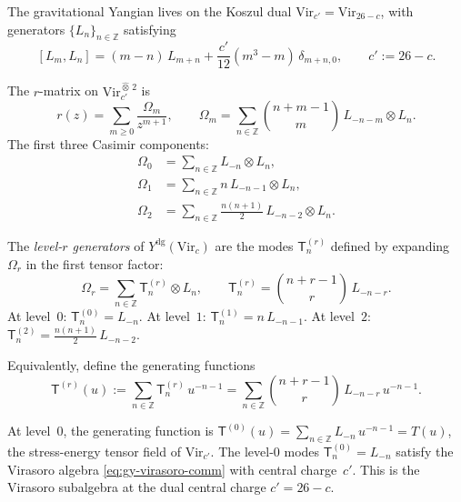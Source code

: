 \documentclass[11pt]{article}
\newcommand{\Z}{\mathbb{Z}}
\begin{document}
The gravitational Yangian lives on the Koszul dual
$\mathrm{Vir}_{c'} = \mathrm{Vir}_{26-c}$, with generators
$\{L_n\}_{n \in \Z}$ satisfying
\begin{equation}\label{eq:gy-virasoro-comm}
[L_m, L_n] = (m-n)\,L_{m+n}
+ \frac{c'}{12}(m^3 - m)\,\delta_{m+n,0},
\qquad c' := 26-c.
\end{equation}

The $r$-matrix on $\mathrm{Vir}_{c'}^{\widehat{\otimes}\,2}$ is
\begin{equation}\label{eq:gy-r-matrix}
r(z) = \sum_{m \ge 0} \frac{\Omega_m}{z^{m+1}},
\qquad
\Omega_m = \sum_{n \in \Z}
\binom{n+m-1}{m}\,L_{-n-m} \otimes L_n.
\end{equation}
The first three Casimir components:
\begin{align}
\Omega_0 &= \sum_{n \in \Z} L_{-n} \otimes L_n, \label{eq:gy-omega0}\\
\Omega_1 &= \sum_{n \in \Z} n\,L_{-n-1} \otimes L_n,
  \label{eq:gy-omega1}\\
\Omega_2 &= \sum_{n \in \Z}
  \tfrac{n(n+1)}{2}\,L_{-n-2} \otimes L_n. \label{eq:gy-omega2}
\end{align}

\begin{definition}
\label{def:gy-level-generators}
The \emph{level-$r$ generators} of $Y^{\mathrm{dg}}(\mathrm{Vir}_c)$
are the modes $\mathsf{T}_n^{(r)}$ defined by expanding $\Omega_r$ in
the first tensor factor:
\[
\Omega_r = \sum_{n \in \Z}
\mathsf{T}_n^{(r)} \otimes L_n,
\qquad
\mathsf{T}_n^{(r)} = \binom{n+r-1}{r}\,L_{-n-r}.
\]
At level~$0$: $\mathsf{T}_n^{(0)} = L_{-n}$.
At level~$1$: $\mathsf{T}_n^{(1)} = n\,L_{-n-1}$.
At level~$2$: $\mathsf{T}_n^{(2)} = \frac{n(n+1)}{2}\,L_{-n-2}$.

Equivalently, define the generating functions
\[
\mathsf{T}^{(r)}(u)
:= \sum_{n \in \Z} \mathsf{T}_n^{(r)}\,u^{-n-1}
= \sum_{n \in \Z} \binom{n+r-1}{r}\,L_{-n-r}\,u^{-n-1}.
\]
\end{definition}

\begin{remark}
At level~$0$, the generating function is
$\mathsf{T}^{(0)}(u) = \sum_{n \in \Z} L_{-n}\,u^{-n-1} = T(u)$,
the stress-energy tensor field of $\mathrm{Vir}_{c'}$.  The level-$0$
modes $\mathsf{T}_n^{(0)} = L_{-n}$ satisfy the Virasoro algebra
\eqref{eq:gy-virasoro-comm} with central charge~$c'$.
This is the Virasoro subalgebra at the dual central charge $c' = 26-c$.
\end{remark}
\end{document}
